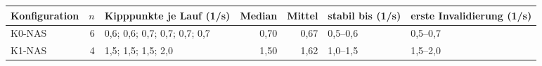 \begin{tabular}{lrlrrll}
\toprule
Konfiguration & $n$ & Kipppunkte je Lauf (1/s) & Median & Mittel & stabil bis (1/s) & erste Invalidierung (1/s) \\
\midrule
K0-NAS & 6 & 0,6; 0,6; 0,7; 0,7; 0,7; 0,7 & 0,70 & 0,67 & 0,5–0,6 & 0,5–0,7 \\
K1-NAS & 4 & 1,5; 1,5; 1,5; 2,0 & 1,50 & 1,62 & 1,0–1,5 & 1,5–2,0 \\
\bottomrule
\end{tabular}
